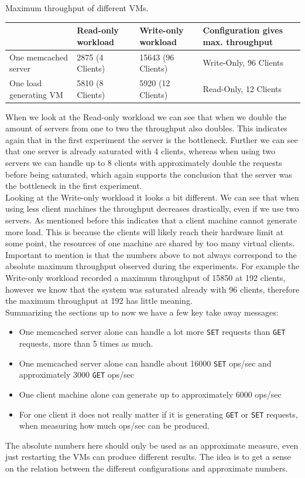 \documentclass[11pt,a4paper]{article}
\begin{document}
\begin{center}
	{Maximum throughput of different VMs.}
	\begin{tabular}{|l|p{2cm}|p{2cm}|p{4cm}|}
		\hline                        & Read-only workload & Write-only workload & Configuration gives max. throughput \\ 
		\hline One memcached server   & 2875 (4 Clients)   & 15643 (96 Clients)  & Write-Only, 96 Clients       \\ 
		\hline One load generating VM & 5810 (8 Clients)  & 5920 (12 Clients)   & Read-Only, 12 Clients         \\ 
		\hline 
	\end{tabular}
\end{center}
%
When we look at the Read-only workload we can see that when we double the amount of servers from one to two the throughput also doubles. 
%
This indicates again that in the first experiment the server is the bottleneck.
%
Further we can see that one server is already saturated with 4 clients, whereas when using two servers we can handle up to 8 clients with approximately double the requests before being saturated, which again supports the conclusion that the server was the bottleneck in the first experiment.
%
\\
%
Looking at the Write-only workload it looks a bit different.
%
We can see that when using less client machines the throughput decreases drastically, even if we use two servers.
%
As mentioned before this indicates that a client machine cannot generate more load.
%
This is because the clients will likely reach their hardware limit at some point, the resources of one machine are shared by too many virtual clients.
%
\\
%
Important to mention is that the numbers above to not always correspond to the absolute maximum throughput observed during the experiments.
%
For example the Write-only workload recorded a maximum throughput of 15850 at 192 clients, however we know that the system was saturated already with 96 clients, therefore the maximum throughput at 192 has little meaning.
%
\\
%
Summarizing the sections up to now we have a few key take away messages:
%
\begin{itemize}
	\item One memcached server alone can handle a lot more \texttt{SET} requests than \texttt{GET} requests, more than 5 times as much.
	\item One memcached server alone can handle about 16000 \texttt{SET} ops/sec and approximately 3000 \texttt{GET} ops/sec
	\item One client machine alone can generate up to approximately 6000 ops/sec
	\item For one client it does not really matter if it is generating \texttt{GET} or \texttt{SET} requests, when measuring how much ops/sec can be produced.
\end{itemize}
%
The absolute numbers here should only be used as an approximate measure, even just restarting the VMs can produce different results. 
%
The idea is to get a sense on the relation between the different configurations and approximate numbers.
%
\end{document}

